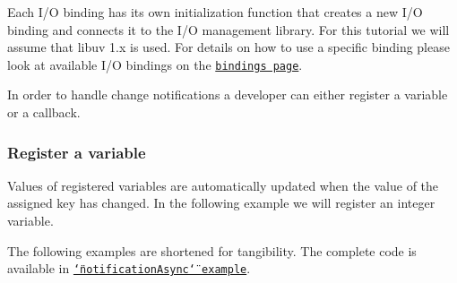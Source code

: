 Each I/O binding has its own initialization function that creates a new I/O binding and connects it to the I/O management library. For this tutorial we will assume that libuv 1.\+x is used. For details on how to use a specific binding please look at available I/O bindings on the \href{https://www.libelektra.org/bindings/readme}{\tt bindings page}.

In order to handle change notifications a developer can either register a variable or a callback.

\subsubsection*{Register a variable}

Values of registered variables are automatically updated when the value of the assigned key has changed. In the following example we will register an integer variable.

The following examples are shortened for tangibility. The complete code is available in \href{https://www.libelektra.org/examples/notificationasync}{\tt \char`\"{}notification\+Async\char`\"{} example}.


